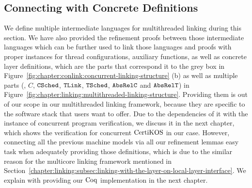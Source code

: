 \subsection{Connecting with Concrete Definitions}
\label{chapter:linking:subsec:connecting-with-thread-local-machine-model}

We define multiple intermediate languages for multithreaded linking during this section.
We have also provided the refinement proofs between those intermediate languages which can be further used to link those languages and proofs  
with proper instances for thread configurations, auxiliary functions, as well as 
concrete layer definitions,
which are the parts that correspond it to the grey box in Figure~\ref{fig:chapter:conlink:concurrent-linking-structure} (b) as well as 
multiple parts (\ie, $C$, ${{\mathrm{\texttt{CSched}}}}$, ${{\mathrm{\texttt{TLink}}}}$, ${{\mathrm{\texttt{TSched}}}}$, ${{\mathrm{\texttt{AbsRelC}}}}$ and ${{\mathrm{\texttt{AbsRelT}}}}$)
in Figure~\ref{fig:chapter:linking:multithreaded-linking-structure}. 
Providing them is out of our scope in our multithreaded linking framework,
because they are specific to the software stack that users want to offer. 
Due to the dependencies of it with the instance of concurrent program verification, 
we discuss it in the next chapter, which shows the verification for concurrent $\mathrm{CertiKOS}$ in our case. 
However, connecting all the previous machine models via
all our refinement lemmas 
easy task when adequately providing those definitions, which is due to the similar reason for the multicore linking framework mentioned in Section~\ref{chapter:linking:subsec:linking-with-the-layer-on-local-layer-interface}.
We explain with providing our $\mathrm{Coq}$ implementation in the next chapter.

